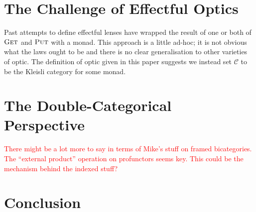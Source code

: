 \documentclass[11pt,a4paper]{article}
\theoremstyle{plain}
\theoremstyle{definition}
\newcommand{\C}{\mathscr{C}}
\newcommand{\fget}{\textsc{Get}}
\newcommand{\fput}{\textsc{Put}}
\newcommand{\todo}[1]{\textcolor{red}{\small #1}}
\begin{document}
\section{The Challenge of Effectful Optics}

Past attempts \cite{ReflectionsOnMonadicLenses} to define effectful lenses have wrapped the result of one or both of $\fget$ and $\fput$ with a monad. This approach is a little ad-hoc; it is not obvious what the laws ought to be and there is no clear generalisation to other varieties of optic. The definition of optic given in this paper suggests we instead set $\C$ to be the Kleisli category for some monad.

\section{The Double-Categorical Perspective}

\todo{There might be a lot more to say in terms of Mike's stuff on framed bicategories. The ``external product'' operation on profunctors seems key. This could be the mechanism behind the indexed stuff?}


\section{Conclusion}



\end{document}

